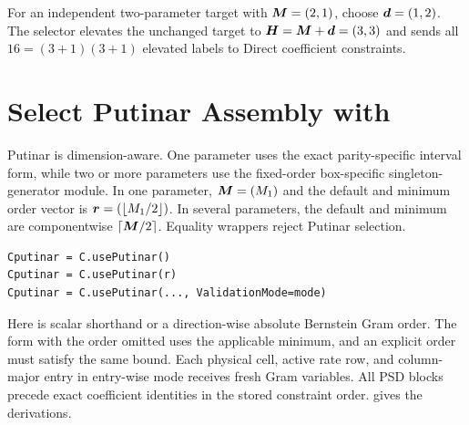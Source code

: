  For an independent two-parameter target with $\boldsymbol{M}=(2,1)$, choose $\boldsymbol{d}=(1,2)$. The selector elevates the unchanged target to $\boldsymbol{H}=\boldsymbol{M}+\boldsymbol{d}=(3,3)$ and sends all $16=(3+1)(3+1)$ elevated labels to Direct coefficient constraints.
\begin{center}
\end{center}

\section{Select Putinar Assembly with
\texorpdfstring{}{usePutinar}}
\label{sec:pdlmi-putinar}

Putinar is dimension-aware. One parameter uses the exact parity-specific interval form, while two or more parameters use the fixed-order box-specific singleton-generator module. In one parameter, $\boldsymbol{M}=(M_1)$ and the default and minimum order vector is $\boldsymbol{r}=(\lfloor M_1/2\rfloor)$. In several parameters, the default and minimum are componentwise $\lceil\boldsymbol{M}/2\rceil$. Equality wrappers reject Putinar selection.

\syntaxhead
\begin{lstlisting}[style=dpsyntax]
Cputinar = C.usePutinar()
Cputinar = C.usePutinar(r)
Cputinar = C.usePutinar(..., ValidationMode=mode)
\end{lstlisting}

Here  is scalar shorthand or a direction-wise absolute Bernstein Gram order. The form with the order omitted uses the applicable minimum, and an explicit order must satisfy the same bound. Each physical cell, active rate row, and column-major entry in entry-wise mode receives fresh Gram variables. All PSD blocks precede exact coefficient identities in the stored constraint order.  gives the derivations.

